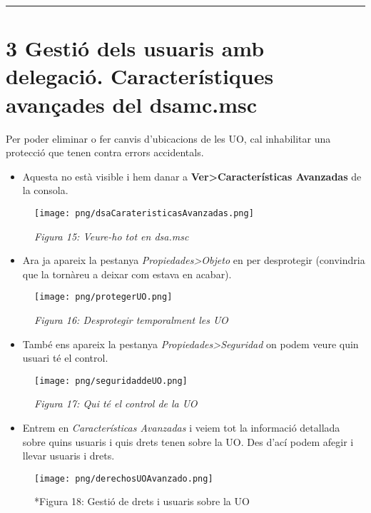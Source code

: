 \documentclass[
  a4paper,
]{article}
\providecommand{\tightlist}{%
  \setlength{\itemsep}{0pt}\setlength{\parskip}{0pt}}
\begin{document}
\begin{center}\rule{0.5\linewidth}{0.5pt}\end{center}

\section{3 Gestió dels usuaris amb delegació. Característiques avançades
del
dsamc.msc}\label{gestiuxf3-dels-usuaris-amb-delegaciuxf3.-caracteruxedstiques-avanuxe7ades-del-dsamc.msc}

Per poder eliminar o fer canvis d'ubicacions de les UO, cal inhabilitar
una protecció que tenen contra errors accidentals.

\begin{itemize}
\tightlist
\item
  Aquesta no està visible i hem danar a
  \textbf{Ver\textgreater Características Avanzadas} de la consola.
\end{itemize}

\begin{figure}
\centering
\texttt{[image: png/dsaCarateristicasAvanzadas.png]}
\caption{\emph{Figura 15: Veure-ho tot en dsa.msc}}
\end{figure}

\begin{itemize}
\tightlist
\item
  Ara ja apareix la pestanya \emph{Propiedades\textgreater Objeto} en
  per desprotegir (convindria que la tornàreu a deixar com estava en
  acabar).
\end{itemize}

\begin{figure}
\centering
\texttt{[image: png/protegerUO.png]}
\caption{\emph{Figura 16: Desprotegir temporalment les UO}}
\end{figure}

\begin{itemize}
\tightlist
\item
  També ens apareix la pestanya \emph{Propiedades\textgreater Seguridad}
  on podem veure quin usuari té el control.
\end{itemize}

\begin{figure}
\centering
\texttt{[image: png/seguridaddeUO.png]}
\caption{\emph{Figura 17: Qui té el control de la UO}}
\end{figure}

\begin{itemize}
\tightlist
\item
  Entrem en \emph{Características Avanzadas} i veiem tot la informació
  detallada sobre quins usuaris i quis drets tenen sobre la UO. Des
  d'ací podem afegir i llevar usuaris i drets.
\end{itemize}

\begin{figure}
\centering
\texttt{[image: png/derechosUOAvanzado.png]}
\caption{*Figura 18: Gestió de drets i usuaris sobre la UO}
\end{figure}
\end{document}
